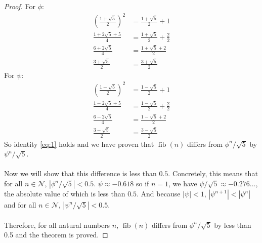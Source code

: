 \documentclass{article}
\DeclareMathOperator{\fib}{fib}
\begin{document}
\begin{proof}
    For $\phi$:
    \begin{align*}
        (\frac{1+\sqrt{5}}{2})^2 &= \frac{1+\sqrt{5}}{2} + 1\\
        \frac{1+2\sqrt{5}+5}{4} &= \frac{1+\sqrt{5}}{2} + \frac{2}{2}\\
        \frac{6+2\sqrt{5}}{4} &= \frac{1+\sqrt{5}+2}{2}\\
        \frac{3+\sqrt{5}}{2} &= \frac{3+\sqrt{5}}{2}
    \end{align*}
    For $\psi$:
    \begin{align*}
        (\frac{1-\sqrt{5}}{2})^2 &= \frac{1-\sqrt{5}}{2} + 1\\
        \frac{1-2\sqrt{5}+5}{4} &= \frac{1-\sqrt{5}}{2} + \frac{2}{2}\\
        \frac{6-2\sqrt{5}}{4} &= \frac{1-\sqrt{5}+2}{2}\\
        \frac{3-\sqrt{5}}{2} &= \frac{3-\sqrt{5}}{2}
    \end{align*}
    So identity \eqref{eq:1} holds and we have proven that $\fib(n)$ differs from $\phi^n/\sqrt{5}$ by $\psi^n/\sqrt{5}$.\\ \\
    Now we will show that this difference is less than $0.5$. Concretely, this means that for all $n\in\mathcal{N}$, $\left|\phi^n/\sqrt{5}\right| < 0.5$. $\psi \approx -0.618$ so if $n=1$, we have $\psi/\sqrt{5} \approx -0.276\ldots$, the absolute value of which is less than $0.5$. And because $\left|\psi\right| < 1$, $\left|\psi^{n+1}\right| < \left|\psi^n\right|$ and for all $n\in\mathcal{N}$, $\left|\psi^n/\sqrt{5}\right| < 0.5$.\\ \\
    Therefore, for all natural numbers $n$, $\fib(n)$ differs from $\phi^n/\sqrt{5}$ by less than 0.5 and the theorem is proved.
\end{proof}
\end{document}
